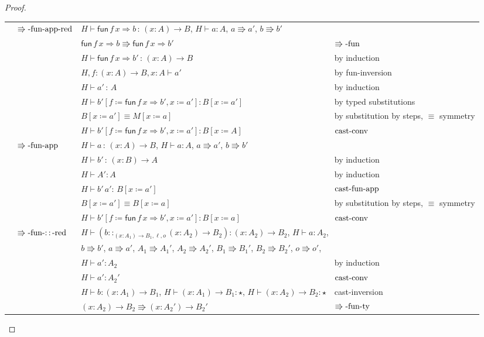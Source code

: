 \begin{proof}
\begin{tabular}{llll}
 & $\operatorname{\Rrightarrow-fun-app-red}$ & \multicolumn{2}{l}{$H\vdash\mathsf{fun}\,f\,x\Rightarrow b\,:\,\left(x:A\right)\rightarrow B$,
$H\vdash a:A$, $a\Rrightarrow a'$, $b\Rrightarrow b'$}\tabularnewline
 &  & $\mathsf{fun}\,f\,x\Rightarrow b\Rrightarrow\mathsf{fun}\,f\,x\Rightarrow b'$ & $\operatorname{\Rrightarrow-fun}$\tabularnewline
 &  & $H\vdash\mathsf{fun}\,f\,x\Rightarrow b'\,:\,\left(x:A\right)\rightarrow B$ & by induction\tabularnewline
 &  & $H,f:\left(x:A\right)\rightarrow B,x:A\vdash a'$ & by fun-inversion\tabularnewline
 &  & $H\vdash a'\,:\,A$ & by induction\tabularnewline
 &  & $H\vdash b'\left[f\coloneqq\mathsf{fun}\,f\,x\Rightarrow b',x\coloneqq a'\right]:B\left[x\coloneqq a'\right]$ & by typed substitutions\tabularnewline
 &  & $B\left[x\coloneqq a'\right]\equiv M\left[x\coloneqq a\right]$ & by substitution by steps, $\equiv$ symmetry\tabularnewline
 &  & $H\vdash b'\left[f\coloneqq\mathsf{fun}\,f\,x\Rightarrow b',x\coloneqq a'\right]:B\left[x\coloneqq A\right]$ & $\operatorname{cast-conv}$\tabularnewline
 & $\operatorname{\Rrightarrow-fun-app}$ & $H\vdash a\,:\,\left(x:A\right)\rightarrow B$, $H\vdash a:A$, $a\Rrightarrow a'$,
$b\Rrightarrow b'$ & \tabularnewline
 &  & $H\vdash b'\,:\,\left(x:B\right)\rightarrow A$ & by induction\tabularnewline
 &  & $H\vdash A':A$ & by induction\tabularnewline
 &  & $H\vdash b'\,a':\,B\left[x\coloneqq a'\right]$ & $\operatorname{cast-fun-app}$\tabularnewline
 &  & $B\left[x\coloneqq a'\right]\equiv B\left[x\coloneqq a\right]$ & by substitution by steps, $\equiv$ symmetry\tabularnewline
 &  & $H\vdash b'\left[f\coloneqq\mathsf{fun}\,f\,x\Rightarrow b',x\coloneqq a'\right]:B\left[x\coloneqq a\right]$ & $\operatorname{cast-conv}$\tabularnewline
 & $\operatorname{\Rrightarrow-fun-::-red}$ & \multicolumn{2}{l}{$H\vdash\left(b::_{\left(x:A_{1}\right)\rightarrow B_{1},\ell ,o}\left(x:A_{2}\right)\rightarrow B_{2}\right):\left(x:A_{2}\right)\rightarrow B_{2}$,
$H\vdash a:A_{2}$, }\tabularnewline
 &  & \multicolumn{2}{l}{$b\Rrightarrow b'$, $a\Rrightarrow a'$, $A_{1}\Rrightarrow A_{1}'$,
$A_{2}\Rrightarrow A_{2}'$, $B_{1}\Rrightarrow B_{1}'$, $B_{2}\Rrightarrow B_{2}'$,
$o\Rrightarrow o'$, }\tabularnewline
 &  & $H\vdash a':A_{2}$ & by induction\tabularnewline
 &  & $H\vdash a':A_{2}'$ & $\operatorname{cast-conv}$\tabularnewline
 &  & $H\vdash b:\left(x:A_{1}\right)\rightarrow B_{1}$, $H\vdash\left(x:A_{1}\right)\rightarrow B_{1}:\star$,
$H\vdash\left(x:A_{2}\right)\rightarrow B_{2}:\star$ & cast-inversion \tabularnewline
 &  & $\left(x:A_{2}\right)\rightarrow B_{2}\Rrightarrow\left(x:A_{2}'\right)\rightarrow B_{2}'$ & $\operatorname{\Rrightarrow-fun-ty}$\tabularnewline

\end{tabular}
\end{proof}
